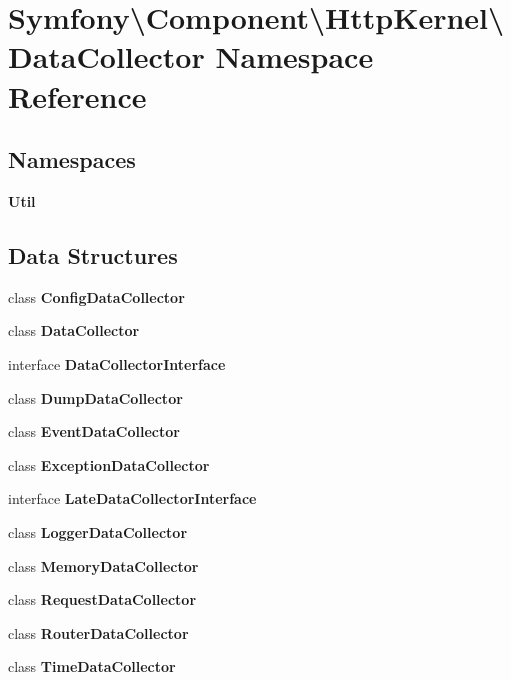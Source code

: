 \section{Symfony\textbackslash{}Component\textbackslash{}Http\+Kernel\textbackslash{}Data\+Collector Namespace Reference}
\label{namespace_symfony_1_1_component_1_1_http_kernel_1_1_data_collector}
\subsection*{Namespaces}
\begin{DoxyCompactItemize}
\item 
 {\bf Util}
\end{DoxyCompactItemize}
\subsection*{Data Structures}
\begin{DoxyCompactItemize}
\item 
class {\bf Config\+Data\+Collector}
\item 
class {\bf Data\+Collector}
\item 
interface {\bf Data\+Collector\+Interface}
\item 
class {\bf Dump\+Data\+Collector}
\item 
class {\bf Event\+Data\+Collector}
\item 
class {\bf Exception\+Data\+Collector}
\item 
interface {\bf Late\+Data\+Collector\+Interface}
\item 
class {\bf Logger\+Data\+Collector}
\item 
class {\bf Memory\+Data\+Collector}
\item 
class {\bf Request\+Data\+Collector}
\item 
class {\bf Router\+Data\+Collector}
\item 
class {\bf Time\+Data\+Collector}
\end{DoxyCompactItemize}

